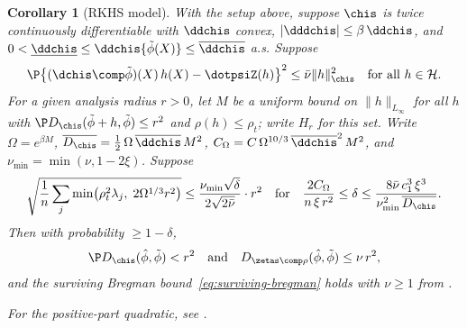\documentclass{article}
\newtheorem{corollary}[theorem]{Corollary}
\begin{document}
\begin{corollary}[RKHS model]
\label{cor:rkhs}
With the setup above,
suppose $\chis$ is twice continuously differentiable
with $\ddchis$ convex, $|\dddchis| \le \beta\,\ddchis$,
and $0 < \underline{\ddchis}
  \le \ddchis\{\tilde\phi(X)\}
  \le \overline{\ddchis}$ a.s.
Suppose
\[
\P\qty{(\dchis \comp \tilde\phi)(X)\, h(X) - \dotpsiZ(h)}^2
  \le \bar\nu \|h\|_{\chis}^2
  \quad \text{for all } h \in \mathcal{H}.
\]
For a given analysis radius $r > 0$,
let $M$ be a uniform bound
on $\|h\|_{L_\infty}$
for all $h$ with
$\P D_{\chis}(\tilde\phi+h,\tilde\phi) \le r^2$
and $\rho(h) \le \rho_t$;
write $H_r$ for this set.
Write $\Omega = e^{\beta M}$,
$\overline{D_{\chis}}
  = \tfrac{1}{2}\,\Omega\, \overline{\ddchis}\, M^2$,
$C_\Omega = C\,\Omega^{10/3}\,\overline{\ddchis}^2\,M^2$,
and $\nu_{\min} = \min(\nu, 1-2\xi)$.
Suppose
\begin{equation}\label{eq:rkhs-condition}
\sqrt{\frac{1}{n}
  \sum_j \min\!\qty(\rho_t^2\lambda_j,\;
      2\Omega^{1/3}r^2)}
  \le \frac{\nu_{\min}\sqrt\delta}{2\sqrt{2\bar\nu}}
    \cdot r^2
\qqtext{for}
\frac{2C_\Omega}{n\,\xi\,r^2}
  \le \delta
  \le \frac{8\bar\nu\,c_1^3\,\xi^3}
    {\nu_{\min}^2\,\overline{D_{\chis}}}.
\end{equation}
Then with probability $\ge 1 - \delta$,
\[
\P D_{\chis}(\hat\phi, \tilde\phi) < r^2
\qqtext{and}
D_{\zetas \comp \rho}(\hat\phi, \tilde\phi) \le \nu\, r^2,
\]
and the surviving Bregman bound~\eqref{eq:surviving-bregman}
holds with $\nu \ge 1$ from .

For the positive-part quadratic,
see .
\end{corollary}
\end{document}
